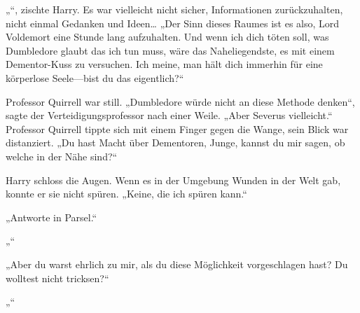 „“, zischte Harry.
Es war vielleicht nicht sicher, Informationen zurückzuhalten, nicht einmal Gedanken und Ideen…
„Der Sinn dieses Raumes ist es also, Lord Voldemort eine Stunde lang aufzuhalten. Und wenn ich dich töten soll, was Dumbledore glaubt das ich tun muss, wäre das Naheliegendste, es mit einem Dementor-Kuss zu versuchen. Ich meine, man hält dich immerhin für eine körperlose Seele—bist du das eigentlich?“

Professor Quirrell war still.
„Dumbledore würde nicht an diese Methode denken“, sagte der Verteidigungsprofessor nach einer Weile.
„Aber Severus vielleicht.“
Professor Quirrell tippte sich mit einem Finger gegen die Wange, sein Blick war distanziert.
„Du hast Macht über Dementoren, Junge, kannst du mir sagen, ob welche in der Nähe sind?“

Harry schloss die Augen.
Wenn es in der Umgebung Wunden in der Welt gab, konnte er sie nicht spüren.
„Keine, die ich spüren kann.“

„Antworte in Parsel.“

„“

„Aber du warst ehrlich zu mir, als du diese Möglichkeit vorgeschlagen hast? Du wolltest nicht tricksen?“

„“

